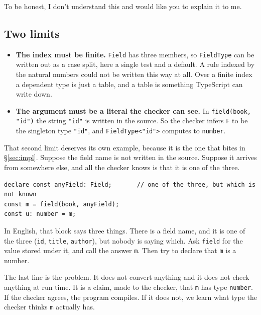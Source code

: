\documentclass[11pt,a4paper]{article}
\begin{document}
\begin{pinkbox}
\begin{orestisbox}
To be honest, I don't understand this and would like you to explain it to me.
\end{orestisbox}

\subsection{Two limits}

\begin{itemize}\setlength{\itemsep}{4pt}

\item \textbf{The index must be finite.} \texttt{Field} has three members, so \texttt{FieldType}
      can be written out as a case split, here a single test and a default. A rule indexed by the
      natural numbers could not be written this way at all. Over a finite index a dependent type
      is just a table, and a table is something TypeScript can write down.

\item \textbf{The argument must be a literal the checker can see.} In
      \texttt{field(book, "id")} the string \texttt{"id"} is written in the source. So the checker
      infers \texttt{F} to be the singleton type \texttt{"id"}, and \texttt{FieldType<"id">}
      computes to \texttt{number}.

\end{itemize}

That second limit deserves its own example, because it is the one that bites in
§\ref{sec:impl}. Suppose the field name is not written in the source. Suppose it arrives from
somewhere else, and all the checker knows is that it is one of the three.

\begin{lstlisting}[language=TS]
declare const anyField: Field;       // one of the three, but which is not known
const m = field(book, anyField);
const u: number = m;
\end{lstlisting}

In English, that block says three things. There is a field name, and it is one of the three
(\texttt{id}, \texttt{title}, \texttt{author}), but nobody is saying which. Ask \texttt{field} for
the value stored under it, and call the answer \texttt{m}. Then try to declare that \texttt{m} is
a number.

The last line is the problem. It does not convert anything and it does not check anything at run
time. It is a claim, made to the checker, that \texttt{m} has type \texttt{number}. If the checker
agrees, the program compiles. If it does not, we learn what type the checker thinks \texttt{m}
actually has.


\end{pinkbox}
\end{document}
